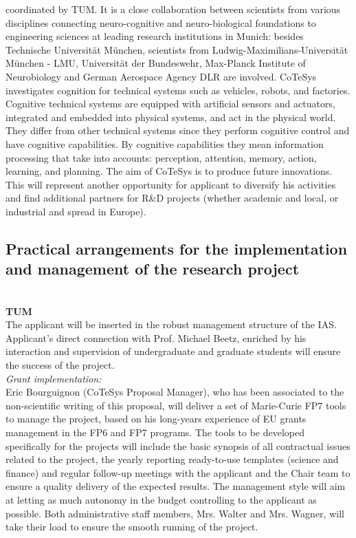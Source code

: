 coordinated by TUM.  It is  a  close collaboration  between  scientists from  various
disciplines    connecting    neuro-cognitive   and    neuro-biological
foundations to  engineering sciences at  leading research institutions
in  Munich: besides  Technische Universit\"at  M\"unchen,  scientists from
Ludwig-Maximilians-Universit\"at   M\"unchen   -   LMU,  Universit\"at   der
Bundeswehr, Max-Planck Institute  of Neurobiology and German Aerospace
Agency  DLR are involved. CoTeSys
investigates cognition for technical systems such as vehicles, robots,
and   factories.  Cognitive  technical   systems  are   equipped  with
artificial  sensors  and   actuators,  integrated  and  embedded  into
physical  systems, and  act in  the physical  world. They  differ from
other technical systems since  they perform cognitive control and have
cognitive   capabilities.   By   cognitive  capabilities   they   mean
information processing that take into accounts: perception, attention,
memory,  action, learning,  and planning.  The  aim of  CoTeSys is  to
produce future  innovations.  This will  represent another opportunity
for applicant to diversify his activities and find additional partners for R\&D
projects  (whether academic  and local,  or industrial  and  spread in
Europe).
\subsection{Practical arrangements for the implementation and 
management of the research project } 
\\
\textbf{TUM}\\
The applicant will be inserted in the robust management structure of the IAS. 
Applicant's direct connection with Prof. Michael Beetz, enriched by his interaction 
and supervision of undergraduate and graduate students  will ensure the success of the project. \\
\emph{Grant implementation:}\\
Eric Bourguignon  (CoTeSys Proposal Manager), who  has been associated
to the  non-scientific writing of  this proposal, will deliver  a
set of Marie-Curie FP7  tools to manage the  project, based on
his long-years experience  of EU grants management in  the FP6 and FP7
programs. The tools to be developed specifically for the projects will
include the  basic synopsis of  all contractual issues related  to the
project,  the  yearly reporting  ready-to-use  templates (science  and
finance) and regular follow-up meetings  with the applicant and the Chair 
team to ensure  a quality  delivery of  the expected  results.  The management
style will aim  at letting as much autonomy  in the budget controlling
to the applicant as possible. Both  administrative staff members, Mrs. Walter and
Mrs. Wagner, will take their load  to ensure the smooth running of the
project.


